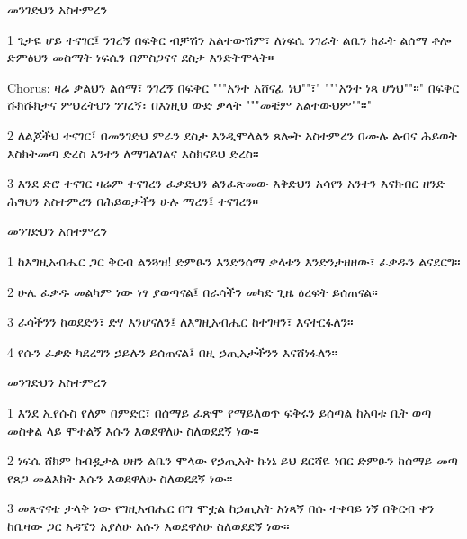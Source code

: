\documentclass[12pt]{article}
\begin{document}
\begin{hymn}{4}{መንገድህን አስተምረን}
\begin{stanza}
1 ጌታዬ ሆይ ተናገር፤
ንገረኝ በፍቅር
ብቻሽን አልተውሽም፣
ለነፍሴ ንገራት
ልቤን ክፈት ልሰማ
ቶሎ ድምፅህን መስማት
ነፍሴን በምስጋናና
ደስታ እንድትሞላት።
\end{stanza}
\begin{chorus}
Chorus: ዛሬ ቃልህን ልሰማ፣
ንገረኝ በፍቅር
"""አንተ አሸናፊ ነህ""፣"
"""አንተ ነጻ ሆነህ""።"
በፍቅር ሹክሹክታና
ምህረትህን ንገረኝ፣
በእነዚህ ውድ ቃላት
"""መቼም አልተውህም""።"
\end{chorus}
\begin{stanza}
2 ለልጆችህ ተናገር፤
በመንገድህ ምራን
ደስታ እንዲሞላልን
ጸሎት አስተምረን
በሙሉ ልብና ሕይወት
እስክትመጣ ድረስ
አንተን ለማገልገልና
እስክናይህ ድረስ።
\end{stanza}
\begin{stanza}
3 እንደ ድሮ ተናገር
ዛሬም ተናገረን
ፈቃድህን ልንፈጽመው
እቅድህን አሳየን
አንተን እናክብር ዘንድ
ሕግህን አስተምረን
በሕይወታችን ሁሉ
ማረን፤ ተናገረን።
\end{stanza}
\end{hymn}

\begin{hymn}{4}{መንገድህን አስተምረን}
\begin{stanza}
1 ከእግዚአብሔር ጋር ቅርብ ልንጓዝ!
ድምፁን እንድንሰማ
ቃላቱን እንድንታዘዘው፣
ፈቃዱን ልናደርግ።
\end{stanza}
\begin{stanza}
2 ሁሌ ፈቃዱ መልካም ነው
ነፃ ያወጣናል፤
በራሳችን መካድ ጊዜ
ዕረፍት ይሰጠናል።
\end{stanza}
\begin{stanza}
3 ራሳችንን ከወደድን፣
ድሃ እንሆናለን፤
ለእግዚአብሔር ከተገዛን፣
እናተርፋለን።
\end{stanza}
\begin{stanza}
4 የሱን ፈቃድ ካደረግን
ኃይሉን ይሰጠናል፤
በዚ ኃጢአታችንን
እናሸነፋለን።
\end{stanza}
\end{hymn}

\begin{hymn}{4}{መንገድህን አስተምረን}
\begin{stanza}
1 እንደ ኢየሱስ የለም
በምድር፣ በሰማይ
ፈጽሞ የማይለወጥ
ፍቅሩን ይሰጣል
ከአባቱ ቤት ወጣ
መስቀል ላይ ሞተልኝ
እሱን እወደዋለሁ
ስለወደደኝ ነው።
\end{stanza}
\begin{stanza}
2 ነፍሴ ሸክም ከብዷታል
ሀዘን ልቤን ሞላው
የኃጢአት ኩነኔ
ይህ ደርሻዬ ነበር
ድምፁን ከሰማይ መጣ
የጸጋ መልእክት
እሱን እወደዋለሁ
ስለወደደኝ ነው።
\end{stanza}
\begin{stanza}
3 መጽናናቴ ታላቅ ነው
የግዚአብሔር በግ ሞቷል
ከኃጢአት አነጻኝ
በሱ ተቀባይ ነኝ
በቅርብ ቀን ከቤዛው ጋር
አዳኜን አያለሁ
እሱን እወደዋለሁ
ስለወደደኝ ነው።
\end{stanza}
\end{hymn}
\end{document}
